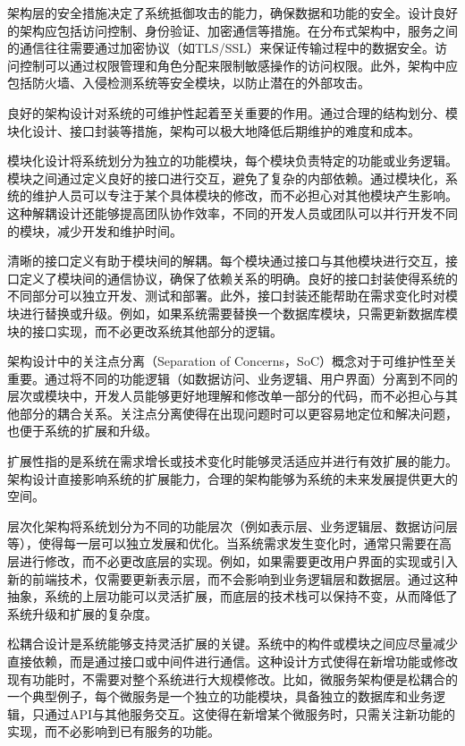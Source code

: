 架构层的安全措施决定了系统抵御攻击的能力，确保数据和功能的安全。设计良好的架构应包括访问控制、身份验证、加密通信等措施。在分布式架构中，服务之间的通信往往需要通过加密协议（如TLS/SSL）来保证传输过程中的数据安全。访问控制可以通过权限管理和角色分配来限制敏感操作的访问权限。此外，架构中应包括防火墙、入侵检测系统等安全模块，以防止潜在的外部攻击。


良好的架构设计对系统的可维护性起着至关重要的作用。通过合理的结构划分、模块化设计、接口封装等措施，架构可以极大地降低后期维护的难度和成本。

模块化设计将系统划分为独立的功能模块，每个模块负责特定的功能或业务逻辑。模块之间通过定义良好的接口进行交互，避免了复杂的内部依赖。通过模块化，系统的维护人员可以专注于某个具体模块的修改，而不必担心对其他模块产生影响。这种解耦设计还能够提高团队协作效率，不同的开发人员或团队可以并行开发不同的模块，减少开发和维护时间。

清晰的接口定义有助于模块间的解耦。每个模块通过接口与其他模块进行交互，接口定义了模块间的通信协议，确保了依赖关系的明确。良好的接口封装使得系统的不同部分可以独立开发、测试和部署。此外，接口封装还能帮助在需求变化时对模块进行替换或升级。例如，如果系统需要替换一个数据库模块，只需更新数据库模块的接口实现，而不必更改系统其他部分的逻辑。

架构设计中的关注点分离（Separation of Concerns，SoC）概念对于可维护性至关重要。通过将不同的功能逻辑（如数据访问、业务逻辑、用户界面）分离到不同的层次或模块中，开发人员能够更好地理解和修改单一部分的代码，而不必担心与其他部分的耦合关系。关注点分离使得在出现问题时可以更容易地定位和解决问题，也便于系统的扩展和升级。


扩展性指的是系统在需求增长或技术变化时能够灵活适应并进行有效扩展的能力。架构设计直接影响系统的扩展能力，合理的架构能够为系统的未来发展提供更大的空间。

层次化架构将系统划分为不同的功能层次（例如表示层、业务逻辑层、数据访问层等），使得每一层可以独立发展和优化。当系统需求发生变化时，通常只需要在高层进行修改，而不必更改底层的实现。例如，如果需要更改用户界面的实现或引入新的前端技术，仅需要更新表示层，而不会影响到业务逻辑层和数据层。通过这种抽象，系统的上层功能可以灵活扩展，而底层的技术栈可以保持不变，从而降低了系统升级和扩展的复杂度。

松耦合设计是系统能够支持灵活扩展的关键。系统中的构件或模块之间应尽量减少直接依赖，而是通过接口或中间件进行通信。这种设计方式使得在新增功能或修改现有功能时，不需要对整个系统进行大规模修改。比如，微服务架构便是松耦合的一个典型例子，每个微服务是一个独立的功能模块，具备独立的数据库和业务逻辑，只通过API与其他服务交互。这使得在新增某个微服务时，只需关注新功能的实现，而不必影响到已有服务的功能。

